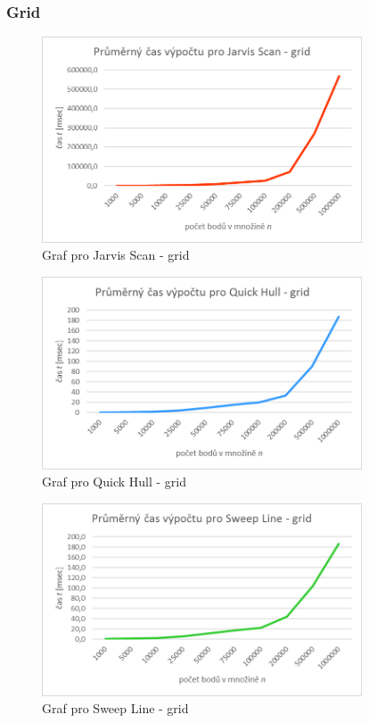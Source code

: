 \documentclass[a4paper, 12pt]{article}
\begin{document}
\subsubsection{Grid}
\begin{figure}[h!]
	\centering
	\includegraphics[width=9.5cm]{./pictures/g_grid_js.png}
	\caption{Graf pro Jarvis Scan - grid}
\end{figure}

\begin{figure}[h!]
	\centering
	\includegraphics[width=9.5cm]{./pictures/g_grid_qh.png}
	\caption{Graf pro Quick Hull - grid}
\end{figure}

\begin{figure}[h!]
	\centering
	\includegraphics[width=9.5cm]{./pictures/g_grid_sl.png}
	\caption{Graf pro Sweep Line - grid}
\end{figure}
\clearpage
\end{document}
